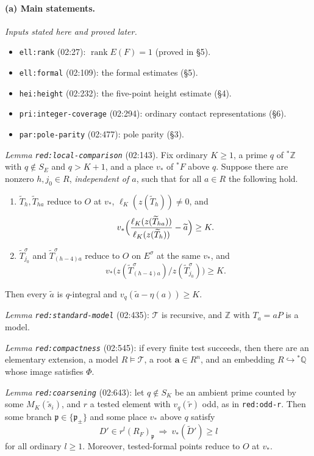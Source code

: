 \documentclass[11pt]{article}
\theoremstyle{definition}
\newcommand{\Q}{\mathbb Q}
\newcommand{\Z}{\mathbb Z}
\newcommand{\sZ}{{}^*\Z}
\newcommand{\sQ}{{}^*\Q}
\newcommand{\sF}{{}^*F}
\newcommand{\lbl}[1]{\texttt{#1}}
\newcommand{\src}[1]{\textsf{#1}}
\DeclareMathOperator{\rank}{rank}
\begin{document}
\paragraph{(a) Main statements.}

\emph{Inputs stated here and proved later.}
\begin{itemize}
\item \lbl{ell:rank} (\src{02:27}): $\rank E(F)=1$ (proved in \S5).
\item \lbl{ell:formal} (\src{02:109}): the formal estimates (\S5).
\item \lbl{hei:height} (\src{02:232}): the five-point height estimate (\S4).
\item \lbl{pri:integer-coverage} (\src{02:294}): ordinary contact representations (\S6).
\item \lbl{par:pole-parity} (\src{02:477}): pole parity (\S3).
\end{itemize}

\emph{Lemma \lbl{red:local-comparison}} (\src{02:143}).
Fix ordinary $K\ge1$, a prime $q$ of $\sZ$ with $q\notin S_E$ and $q>K+1$,
and a place $v_*$ of $\sF$ above $q$.  Suppose there are nonzero
$h,j_0\in R$, \emph{independent of $a$}, such that for all $a\in R$ the
following hold.
\begin{enumerate}[label=(\roman*)]
\item $\widetilde T_h,\widetilde T_{ha}$ reduce to $O$ at $v_*$,
$\ell_K(z(\widetilde T_h))\neq0$, and
\[
 v_*\Bigl(\frac{\ell_K(z(\widetilde T_{ha}))}{\ell_K(z(\widetilde T_h))}-\widetilde a\Bigr)\ge K.
\]
\item $\widetilde T^\sigma_{j_0}$ and $\widetilde T^\sigma_{(h-4)a}$ reduce
to $O$ on $E^\sigma$ at the same $v_*$, and
\[
 v_*\bigl(z(\widetilde T^\sigma_{(h-4)a})/z(\widetilde T^\sigma_{j_0})\bigr)\ge K.
\]
\end{enumerate}
Then every $\widetilde a$ is $q$-integral and
$v_q(\widetilde a-\eta(a))\ge K$.

\emph{Lemma \lbl{red:standard-model}} (\src{02:435}):
$\mathcal T$ is recursive, and $\Z$ with $T_a=aP$ is a model.

\emph{Lemma \lbl{red:compactness}} (\src{02:545}):
if every finite test succeeds, then there are an elementary extension, a
model $R\models\mathcal T$, a root $\mathbf a\in R^n$, and an embedding
$R\hookrightarrow\sQ$ whose image satisfies $\Phi$.

\emph{Lemma \lbl{red:coarsening}} (\src{02:643}):
let $q\notin S_K$ be an ambient prime counted by some
$M_K(\widetilde s_i)$, and $r$ a tested element with $v_q(\widetilde r)$
odd, as in \lbl{red:odd-r}.  Then some branch $\mathfrak p\in\{\mathfrak p_\pm\}$
and some place $v_*$ above $q$ satisfy
\[
 D'\in r^l(R_F)_{\mathfrak p}\ \Longrightarrow\ v_*(\widetilde D')\ge l
\]
for all ordinary $l\ge1$.  Moreover, tested-formal points reduce to $O$ at
$v_*$.
\end{document}
